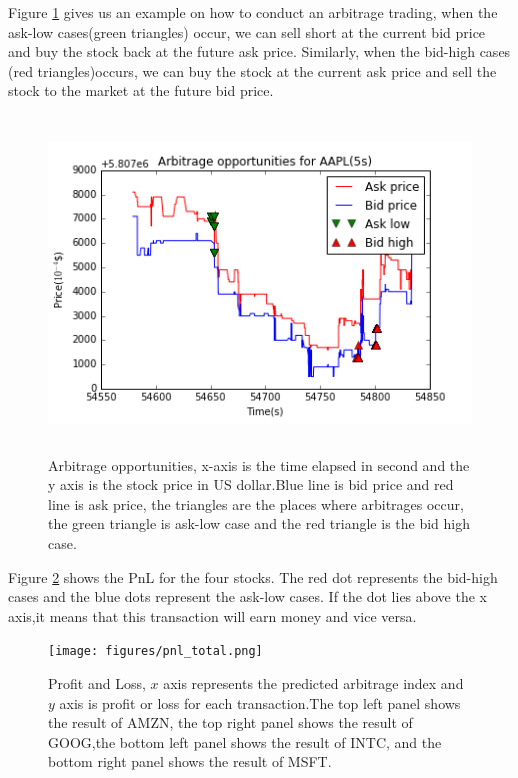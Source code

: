 Figure \ref{fig:arbitrage_plot} gives us an example on how to conduct an arbitrage trading, when the ask-low cases(green triangles) occur, we can sell short at the current bid price and buy the stock back at the future ask price. Similarly, when the bid-high cases (red triangles)occurs, we can buy the stock at the current ask price and sell the stock to the market at the future bid price. 

\begin{figure}[hbtp]
  \begin{center}
    \includegraphics[width=4.5in,height=3.5in]{figures/arbitrage_plot.png}
  \end{center}
\caption{Arbitrage opportunities, x-axis is the time elapsed in second and the y axis is the stock price in US dollar.Blue line is bid price and red line is ask price, the triangles are the places where arbitrages occur, the green triangle is ask-low case and the red triangle is the bid high case. } \label{fig:arbitrage_plot}
\end{figure}


Figure \ref{fig:pnl} shows the PnL for the four stocks. The red dot represents the bid-high cases and the blue dots represent the ask-low cases. If the dot lies above the x axis,it means that this transaction will earn money and vice versa.
\begin{figure}[hbtp]
  \begin{center}
    \texttt{[image: figures/pnl\_total.png]}
  \end{center}
\caption{Profit and Loss,  $x$ axis represents the predicted arbitrage index and $y$ axis is profit or loss for each transaction.The top left panel shows the result of AMZN, the top right panel shows the result of GOOG,the bottom left panel shows the result of INTC, and the bottom right panel shows the result of MSFT. } \label{fig:pnl}
\end{figure}

